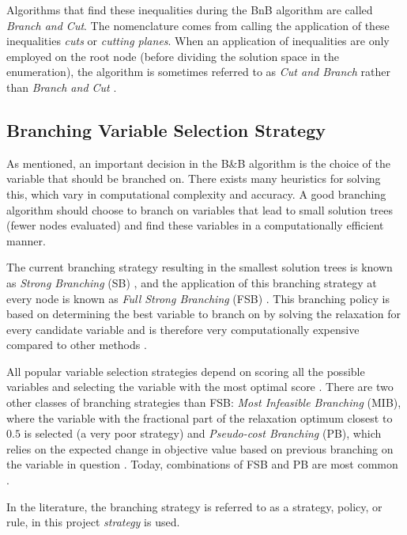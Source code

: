 Algorithms that find these inequalities during the \gls{BnB} algorithm are called \textit{Branch and Cut}. The nomenclature comes from calling the application of these inequalities \textit{cuts} or \textit{cutting planes}.
When an application of inequalities are only employed on the root node (before dividing the solution space in the enumeration), the algorithm is sometimes referred to as \textit{Cut and Branch} rather than \textit{Branch and Cut} \cite{wolsey2020integer}.


\subsection{Branching Variable Selection Strategy}\label{ssec:branchingstrategy}

As mentioned, an important decision in the B\&B algorithm is the choice of the variable that should be branched on. 
There exists many heuristics for solving this, which vary in computational complexity and accuracy. 
A good branching algorithm should choose to branch on variables that lead to small solution trees (fewer nodes evaluated) and find these variables in a computationally efficient manner. 

The current branching strategy resulting in the smallest solution trees is known as \textit{Strong Branching} (\gls{SB}) \cite{applegate1995finding}, and the application of this branching strategy at every node is known as \textit{Full Strong Branching} (\gls{FSB}) \cite{achterberg2004branching}. 
This branching policy is based on determining the best variable to branch on by solving the relaxation for every candidate variable and is therefore very computationally expensive compared to other methods \cite{achterberg2004branching}.

All popular variable selection strategies depend on scoring all the possible variables and selecting the variable with the most optimal score \cite{achterberg2004branching}. There are two other classes of branching strategies than \gls{FSB}: \textit{Most Infeasible Branching} (\gls{MIB}), where the variable with the fractional part of the relaxation optimum closest to $0.5$ is selected (a very poor strategy) 
and \textit{Pseudo-cost Branching} (\gls{PB}), which relies on the expected change in objective value based on previous branching on the variable in question
\cite{achterberg2004branching}. Today, combinations of \gls{FSB} and \gls{PB} are most common \cite{anand2017comparative}.   

In the literature, the branching strategy is referred to as a strategy, policy, or rule, in this project \textit{strategy} is used.  


